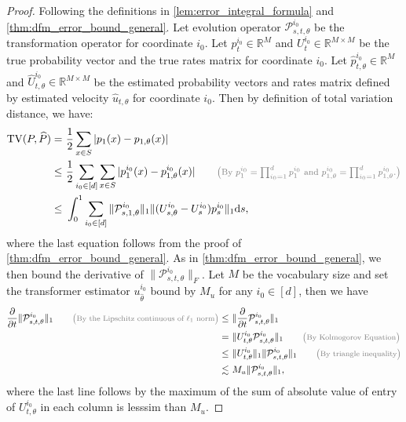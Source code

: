 \documentclass[12pt]{article}
\numberwithin{equation}{section}
\let\hat\widehat
\newcommand{\wh}{\widehat}
\renewcommand{\hat}{\wh}
\def\R{\mathbb{R}}
\theoremstyle{theoremstyle}
\numberwithin{equation}{section}
\numberwithin{theorem}{section}
\numberwithin{proposition}{section}
\numberwithin{definition}{section}
\numberwithin{lemma}{section}
\numberwithin{assumption}{section}
\numberwithin{remark}{section}
\newcommand*{\annot}[1]{\tag*{\footnotesize{\textcolor{black!50}{\big(#1\big)}}}}
\begin{document}
\begin{proof}
Following the definitions in \cref{lem:error_integral_formula} and \cref{thm:dfm_error_bound_general}.
Let evolution operator $\mathcal{P}_{s,t,\theta}^{i_0}$ be the transformation operator for coordinate $i_0$.
Let $p_t^{i_0} \in \R^M$ and $U_t^{i_0} \in \R^{M \times M}$ be the true probability vector and the true rates matrix for coordinate $i_0$.
Let $\hat{p}_{t,\theta}^{i_0} \in \R^M$ and $\hat{U}_{t,\theta}^{i_0} \in \R^{M \times M}$ be the estimated probability vectors and rates matrix defined by estimated velocity $\hat{u}_{t,\theta}$ for coordinate $i_0$.
Then by definition of total variation distance, we have:
\begin{align}
    \text{TV}(P,\hat{P})
    = & ~ \frac{1}{2} \sum_{x \in S} |p_1(x)-p_{1,\theta}(x)| \notag \\
    \leq & ~ \frac{1}{2} \sum_{i_0 \in [d]} \sum_{x \in S} |p_1^{i_0}(x)-p^{i_0}_{1,\theta}(x)|
    \annot{By $p_1^{i_0}=\prod_{i_0=1}^dp_1^{i_0}$ and $p_{1,\theta}^{i_0}=\prod_{i_0=1}^dp_{1,\theta}^{i_0}$.} \\
    \leq & ~
    \int_0^1 \sum_{i_0 \in [d]}\|\mathcal{P}_{s,1,\theta}^{i_0}\|_1 
    \|(U_{s,\theta}^{i_0}-U_s^{i_0}) p_s^{i_0}\|_1 \dd s,
    \label{eq:bound_on_tv_distance_mp}
\end{align}
where the last equation follows from the proof of \cref{thm:dfm_error_bound_general}. 
As in \cref{thm:dfm_error_bound_general}, 
we then bound the derivative of $\|\mathcal{P}_{s,t,\theta}^{i_0}\|_F$. 
Let $M$ be the vocabulary size and set the transformer estimator $u_{\hat{\theta}}^{i_0}$ bound by $M_u$ for any $i_0 \in [d]$, then we have
\begin{align}
\label{eq:bound_on_evolution_operator_partial_norm_mp}
    \frac{\partial}{\partial t}\|\mathcal{P}_{s,t,\theta}^{i_0}\|_1 \annot{By the Lipschitz continuous of $\ell_1$ norm} 
    \leq & ~
    \|\frac{\partial}{\partial t}\mathcal{P}_{s,t,\theta}^{i_0}\|_1 \notag\\
    = & ~ \|U_{t,\theta}^{i_0} \mathcal{P}_{s,t,\theta}^{i_0}\|_1 \annot{By Kolmogorov Equation} \\
    \leq & ~ \|U_{t,\theta}^{i_0}\|_1 \|\mathcal{P}_{s,t,\theta}^{i_0}\|_1 \annot{By triangle inequality} \\
    \lesssim & ~
    M_u \|\mathcal{P}^{i_0}_{s,t,\theta}\|_1, 
\end{align}
where the last line follows by the maximum of the sum of absolute value of entry of $U_{t,\theta}^{i_0}$ in each column is lesssim than $M_u$.

\end{proof}
\end{document}
